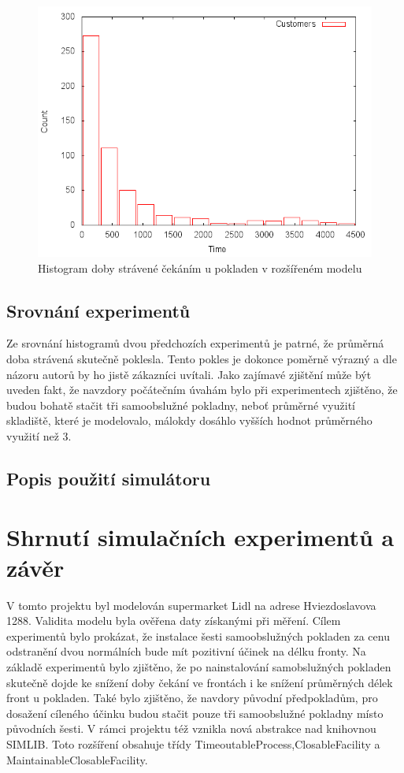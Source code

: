 \documentclass[12pt,a4paper,titlepage]{article}
\begin{document}
\begin{figure}[h]
\centering
\includegraphics[scale=0.75]{advanced}
\caption{Histogram doby strávené čekáním u pokladen v rozšířeném modelu}
\end{figure}

\subsection{Srovnání experimentů}
Ze srovnání histogramů dvou předchozích experimentů je patrné, že průměrná doba strávená skutečně poklesla. Tento pokles je dokonce poměrně výrazný a dle názoru autorů by ho jistě zákazníci uvítali. Jako zajímavé zjištění může být uveden fakt, že navzdory počátečním úvahám bylo při experimentech zjištěno, že budou bohatě stačit tři samoobslužné pokladny, neboť průměrné využití skladiště, které je modelovalo, málokdy dosáhlo vyšších hodnot průměrného využití než 3. 
\subsection{Popis použití simulátoru}





\section{Shrnutí simulačních experimentů a závěr}
V tomto projektu byl modelován supermarket Lidl na adrese Hviezdoslavova 1288. Validita modelu byla ověřena daty získanými při měření. Cílem experimentů bylo prokázat, že instalace šesti samoobslužných pokladen za cenu odstranění dvou normálních bude mít pozitivní účinek na délku fronty. Na základě experimentů bylo zjištěno, že po nainstalování samobslužných pokladen skutečně dojde ke snížení doby čekání ve frontách i ke snížení průměrných délek front u pokladen. Také bylo zjištěno, že navdory původní předpokladům, pro dosažení cíleného účinku budou stačit pouze tři samoobslužné pokladny místo původních šesti. V rámci projektu též vznikla nová abstrakce nad knihovnou SIMLIB. Toto rozšíření   obsahuje třídy TimeoutableProcess,ClosableFacility a MaintainableClosableFacility. 
\end{document}
